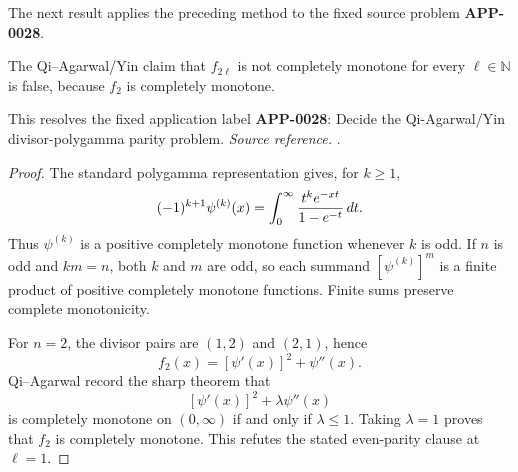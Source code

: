 The next result applies the preceding method to the fixed source problem \textbf{APP-0028}.
\begin{counterexample}
\label{res:qa-divisor-polygamma-even-claim-refuted}
The Qi--Agarwal/Yin claim that \(f_{2\ell}\) is not completely monotone for every \(\ell\in\mathbb N\) is false, because \(f_2\) is completely monotone.

This resolves the fixed application label \textbf{APP-0028}: Decide the Qi-Agarwal/Yin divisor-polygamma parity problem.
\emph{Source reference.} \cite{app-app-0028-source}.
\end{counterexample}
\begin{proof}
The standard polygamma representation gives, for \(k\ge1\),
\[
 (-1)^{k+1}\psi^{(k)}(x)
 =\int_0^\infty {t^ke^{-xt}\over1-e^{-t}}\,dt .
\]
Thus \(\psi^{(k)}\) is a positive completely monotone function whenever
\(k\) is odd.  If \(n\) is odd and \(km=n\), both \(k\) and \(m\) are odd, so
each summand \([\psi^{(k)}]^m\) is a finite product of positive completely
monotone functions.  Finite sums preserve complete monotonicity.

For \(n=2\), the divisor pairs are \((1,2)\) and \((2,1)\), hence
\[
 f_2(x)=[\psi'(x)]^2+\psi''(x).
\]
Qi--Agarwal record the sharp theorem that
\[
 [\psi'(x)]^2+\lambda\psi''(x)
\]
is completely monotone on \((0,\infty)\) if and only if \(\lambda\le1\).
Taking \(\lambda=1\) proves that \(f_2\) is completely monotone.  This refutes
the stated even-parity clause at \(\ell=1\).
\end{proof}

